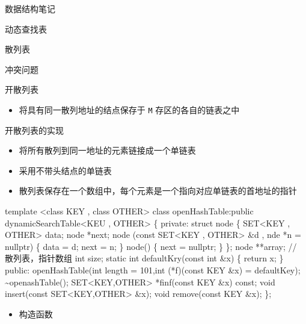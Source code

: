 \documentclass[
  ignorenonframetext,
]{beamer}
\newenvironment{Shaded}{}{}
\newcommand{\NormalTok}[1]{#1}
\providecommand{\tightlist}{%
  \setlength{\itemsep}{0pt}\setlength{\parskip}{0pt}}
\begin{document}
\begin{frame}[fragile]{数据结构笔记}
\begin{block}{动态查找表}
\begin{block}{散列表}
\begin{block}{冲突问题}
\begin{block}{开散列表}
\begin{itemize}
\tightlist
\item
  将具有同一散列地址的结点保存于 \texttt{M} 存区的各自的链表之中
\end{itemize}

\begin{block}{开散列表的实现}
\protect{}\label{ux5f00ux6563ux5217ux8868ux7684ux5b9eux73b0}
\begin{itemize}
\tightlist
\item
  将所有散列到同一地址的元素链接成一个单链表
\item
  采用不带头结点的单链表
\item
  散列表保存在一个数组中，每个元素是一个指向对应单链表的首地址的指针
\end{itemize}

\begin{Shaded}
\begin{Highlighting}[]
\NormalTok{template \textless{}class KEY , class OTHER\textgreater{}}
\NormalTok{class openHashTable:public dynamicSearchTable\textless{}KEU , OTHER\textgreater{}}
\NormalTok{\{}
\NormalTok{  private:}
\NormalTok{    struct node}
\NormalTok{    \{}
\NormalTok{      SET\textless{}KEY , OTHER\textgreater{} data;}
\NormalTok{      node *next;}
\NormalTok{      node (const SET\textless{}KEY , OTHER\textgreater{} \&d , nde *n = nullptr)}
\NormalTok{      \{}
\NormalTok{        data = d;}
\NormalTok{        next = n;}
\NormalTok{      \}}
\NormalTok{      node()}
\NormalTok{      \{}
\NormalTok{        next = nullptr;}
\NormalTok{      \}}
\NormalTok{    \};}
\NormalTok{    node **array; // 散列表，指针数组}
\NormalTok{     int size;}
\NormalTok{     static int defaultKry(const int \&x)}
\NormalTok{     \{}
\NormalTok{        return x;}
\NormalTok{     \}}
\NormalTok{  public:}
\NormalTok{    openHashTable(int length = 101,int (*f)(const KEY \&x) = defaultKey);}
\NormalTok{    \textasciitilde{}openashTable();}
\NormalTok{    SET\textless{}KEY,OTHER\textgreater{} *finf(const KEY \&x) const;}
\NormalTok{    void insert(const SET\textless{}KEY,OTHER\textgreater{} \&x);}
\NormalTok{    void remove(const KEY \&x);}
\NormalTok{\};}
\end{Highlighting}
\end{Shaded}

\begin{itemize}
\tightlist
\item
  构造函数
\end{itemize}


\end{block}
\end{block}
\end{block}
\end{block}
\end{block}
\end{frame}
\end{document}
